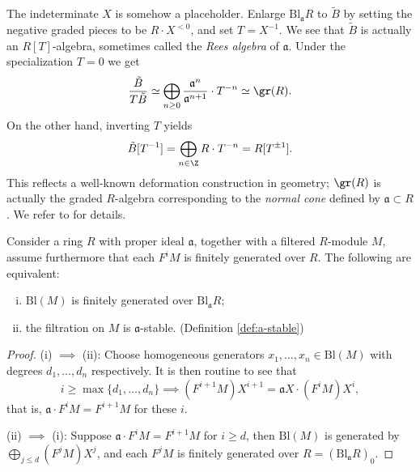 \begin{remark}
	The indeterminate $X$ is somehow a placeholder. Enlarge $\text{Bl}_{\mathfrak{a}} R$ to $\tilde{B}$ by setting the negative graded pieces to be $R \cdot X^{< 0}$, and set $T = X^{-1}$. We see that $\tilde{B}$ is actually an $R[T]$-algebra, sometimes called the \emph{Rees algebra} of $\mathfrak{a}$. Under the specialization $T=0$ we get 
	\[ \frac{ \tilde{B}}{T \tilde{B}} \simeq \bigoplus_{n \geq 0} \frac{\mathfrak{a}^n}{\mathfrak{a}^{n+1}} \cdot T^{-n} \simeq \gr(R). \]
	On the other hand, inverting $T$ yields
	\[ \tilde{B}[T^{-1}] = \bigoplus_{n \in \Z} R \cdot T^{-n} = R[T^{\pm 1}]. \]
	This reflects a well-known deformation construction in geometry; $\gr(R)$ is actually the graded $R$-algebra corresponding to the \emph{normal cone} defined by $\mathfrak{a} \subset R$. We refer to \cite[\S 5.1]{Fu98} for details.
\end{remark}

\begin{lemma}\label{prop:Bl-fg}
	Consider a ring $R$ with proper ideal $\mathfrak{a}$, together with a filtered $R$-module $M$, assume furthermore that each $F^i M$ is finitely generated over $R$. The following are equivalent:
	\begin{enumerate}[(i)]
		\item $\mathrm{Bl}(M)$ is finitely generated over $\mathrm{Bl}_{\mathfrak{a}} R$;
		\item the filtration on $M$ is $\mathfrak{a}$-stable. (Definition \ref{def:a-stable})
	\end{enumerate}
\end{lemma}
\begin{proof}
	(i) $\implies$ (ii): Choose homogeneous generators $x_1, \ldots, x_n \in \text{Bl}(M)$ with degrees $d_1, \ldots, d_n$ respectively. It is then routine to see that
	\[ i \geq \max\{d_1, \ldots, d_n \} \implies (F^{i+1} M) X^{i+1} = \mathfrak{a} X \cdot (F^i M) X^i, \]
	that is, $\mathfrak{a} \cdot F^i M = F^{i+1} M$ for these $i$.

	(ii) $\implies$ (i): Suppose $\mathfrak{a} \cdot F^i M = F^{i+1} M$ for $i \geq d$, then $\text{Bl}(M)$ is generated by $\bigoplus_{j \leq d} (F^j M) X^j$, and each $F^j M$ is finitely generated over $R = (\text{Bl}_{\mathfrak{a}} R)_0$.
\end{proof}

